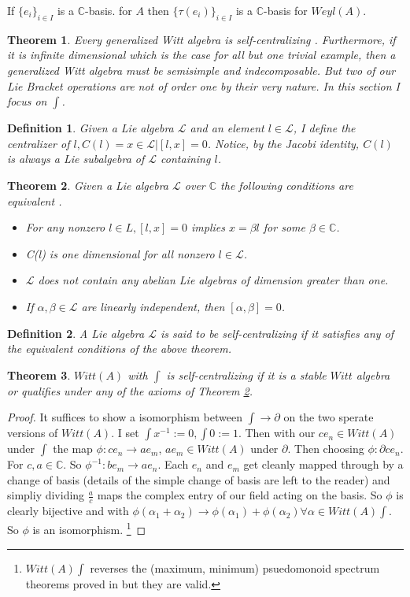 \documentclass{artjlt}
\newtheorem{thm}{Theorem}
\newtheorem{defn}{Definition}
\newcommand{\?}{\textbackslash}
\newcommand{\C}{\mathbb{C}}
\begin{document}
If $\{ e_i\}_{i \in I}$ is a $\C$-basis.
for $A$ then $\{ \tau(e_i) \}_{i \in I}$
is a $\C$-basis for $Weyl(A)$.
\begin{thm}
Every generalized Witt algebra is self-centralizing \cite{pakianathan2010generalizedwittalgebrasvariable}.
Furthermore, if it is infinite dimensional which is the case for all but one trivial example, then a generalized Witt algebra must be semisimple and 
indecomposable. But two of our Lie Bracket operations are not of order one by their very nature. In this section I focus on $\int$.
\end{thm}
\begin{defn}
Given a Lie algebra $\mathcal{L}$ and an element $l \in \mathcal{L}$, I define the
centralizer of $l, C(l) = {x \in \mathcal{L}|[l, x] = 0}$. Notice, by the Jacobi identity, $C(l)$
is always a Lie subalgebra of $\mathcal{L}$ containing $l$.
\end{defn}
\begin{thm} \label{thm:10}
Given a Lie algebra $\mathcal{L}$ over $\C$ the following conditions are equivalent \cite{pakianathan2010generalizedwittalgebrasvariable}.
\begin{itemize}
\item For any nonzero $l \in L, [l, x] = 0$ implies $x = \beta l$ for some $\beta \in \C$.
\item C(l) is one dimensional for all nonzero $l \in \mathcal{L}$.
\item $\mathcal{L}$ does not contain any abelian Lie algebras of dimension greater than one.
\item If $\alpha, \beta \in \mathcal{L}$ are linearly independent, then $[\alpha, \beta] = 0$.
\end{itemize}
\end{thm}
\begin{defn}
   A Lie algebra $\mathcal{L}$ is said to be self-centralizing if it satisfies any
of the equivalent conditions of the above theorem. 
\end{defn}
\begin{thm}
   $Witt(A)$ with $\int$ is self-centralizing if it is a stable $Witt$ algebra or qualifies under any of the axioms of Theorem \ref{thm:10}.
\end{thm}
\begin{proof}
   It suffices to show a isomorphism between $\int \to \partial$ on the two sperate versions of $Witt(A)$. I set $\int x^{-1} := 0, \int 0 := 1$. Then with our $c e_n \in Witt(A)$ under $\int$ the map $\phi: c e_n \to a e_m$, $a e_m \in Witt(A)$ under $\partial$. Then choosing $\phi: \partial c e_n$. For $c, a \in \C$. So $\phi^{-1}: b e_m \to a e_{n}$. 
   Each $e_n$ and $e_m$ get cleanly mapped through by a change of basis (details of the simple change of basis are left to the reader) and simpliy dividing $\frac{a}{c}$ maps the complex entry of our field acting on the basis. So $\phi$ is clearly bijective and with $\phi(\alpha_1 + \alpha_2) \to \phi(\alpha_1)+ \phi(\alpha_2) \forall \alpha \in Witt(A) \int$. So $\phi$ is an isomorphism.
   \footnote{$Witt(A) \int$ reverses the (maximum, minimum) psuedomonoid spectrum theorems proved in \cite{pakianathan2010generalizedwittalgebrasvariable} but they are valid.} 
  \end{proof}
\end{document}
